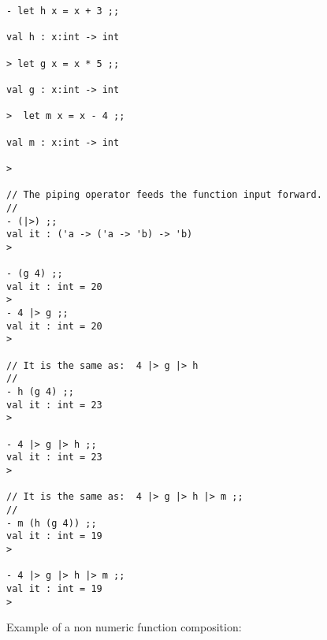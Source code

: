 \documentclass[11pt]{article}
\begin{document}
\begin{verbatim}
- let h x = x + 3 ;; 

val h : x:int -> int

> let g x = x * 5 ;;

val g : x:int -> int

>  let m x = x - 4 ;;

val m : x:int -> int

> 

// The piping operator feeds the function input forward. 
//
- (|>) ;;
val it : ('a -> ('a -> 'b) -> 'b) 
> 

- (g 4) ;;
val it : int = 20
> 
- 4 |> g ;;
val it : int = 20
> 

// It is the same as:  4 |> g |> h 
//
- h (g 4) ;;
val it : int = 23
>

- 4 |> g |> h ;;
val it : int = 23
> 

// It is the same as:  4 |> g |> h |> m ;; 
//
- m (h (g 4)) ;;
val it : int = 19
> 

- 4 |> g |> h |> m ;; 
val it : int = 19
>
\end{verbatim}

Example of a non numeric function composition:
\end{document}
